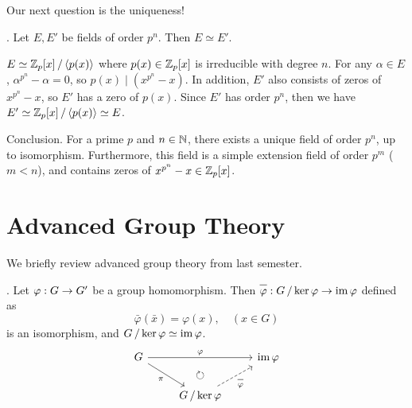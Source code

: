 Our next question is the uniqueness!

\thm. Let \(E, E'\) be fields of order \(p^n\). Then \(E \simeq E'\).

\pf \(E \simeq \mathbb{Z}_p[x] \operatorname{/} \left\langle p(x) \right\rangle\) where \(p(x) \in \mathbb{Z}_p[x]\) is irreducible with degree \(n\). For any \(\alpha \in E\), \(\alpha^{p^n} - \alpha = 0\), so \(p(x) \mid (x^{p^n} - x)\). In addition, \(E'\) also consists of zeros of \(x^{p^n} - x\), so \(E'\) has a zero of \(p(x)\). Since \(E'\) has order \(p^n\), then we have \(E' \simeq \mathbb{Z}_p[x] \operatorname{/} \left\langle p(x) \right\rangle \simeq E\).

Conclusion. For a prime \(p\) and \(n \in \mathbb{N}\), there exists a unique field of order \(p^n\), up to isomorphism. Furthermore, this field is a simple extension field of order \(p^m\) (\(m < n\)), and contains zeros of \(x^{p^n} - x \in \mathbb{Z}_p[x]\).

\pagebreak

\setcounter{chapter}{6}

\chapter{Advanced Group Theory}

We briefly review advanced group theory from last semester.

\setcounter{topic}{33}

\thm.  Let \(\varphi : G \rightarrow G'\) be a group homomorphism. Then \(\bar{\varphi} : G \quotient \ker \varphi \ra \im \varphi\) defined as
\[
    \bar{\varphi}(\bar{x}) = \varphi(x), \quad (x \in G)
\]
is an isomorphism, and \(G \operatorname{/} \ker \varphi \simeq \operatorname{im} \varphi\).
\[
    \begin{tikzcd}
        G \arrow{rr}{\varphi} \arrow[swap]{dr}{\pi} & \arrow[d, phantom, "\circlearrowright"]& \im \varphi \\
        & G \quotient \ker\varphi \arrow[dashed,swap]{ur}{\bar{\varphi}} &
    \end{tikzcd}
\]

